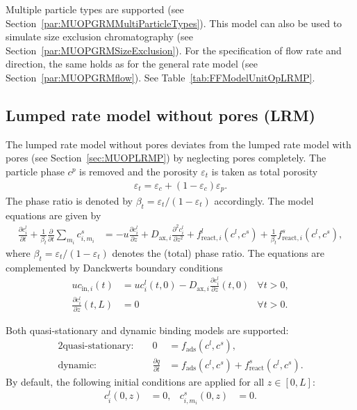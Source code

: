 Multiple particle types are supported (see Section~\ref{par:MUOPGRMMultiParticleTypes}).
This model can also be used to simulate size exclusion chromatography (see Section~\ref{par:MUOPGRMSizeExclusion}).
For the specification of flow rate and direction, the same holds as for the general rate model (see Section~\ref{par:MUOPGRMflow}).
See Table~\ref{tab:FFModelUnitOpLRMP}.

\subsection{Lumped rate model without pores (LRM)}\label{sec:MUOPLRM}

The lumped rate model without pores  \cite{Guiochon2006,Felinger2004} deviates from the lumped rate model with pores (see Section~\ref{sec:MUOPLRMP}) by neglecting pores completely.
The particle phase $c^p$ is removed and the porosity $\varepsilon_t$ is taken as total porosity
\begin{align}
	\varepsilon_t = \varepsilon_c + \left( 1 - \varepsilon_c \right) \varepsilon_p. \label{eq:TotalPorosity}
\end{align}
The phase ratio is denoted by $\beta_t = \varepsilon_t / (1 - \varepsilon_t)$ accordingly.
The model equations are given by
\begin{align}
	\frac{\partial c^l_i}{\partial t} + \frac{1}{\beta_t} \frac{\partial}{\partial t} \sum_{m_i} c^s_{i,m_i} &= -u \frac{\partial c^l_i}{\partial z} + D_{\text{ax},i} \frac{\partial^2 c^l_i}{\partial z^2} + f_{\text{react},i}^l\left( c^l, c^s \right) + \frac{1}{\beta_t} f_{\text{react},i}^s\left( c^l, c^s \right),
\end{align}
where $\beta_t = \varepsilon_t / (1 - \varepsilon_t)$ denotes the (total) phase ratio.
The equations are complemented by Danckwerts boundary conditions \cite{Danckwerts1953}
\begin{align*}
	u c_{\text{in},i}(t) &= u c^l_i(t,0) - D_{\text{ax},i} \frac{\partial c^l_i}{\partial z}(t, 0) & \forall t > 0,\\
	\frac{\partial c^l_i}{\partial z}(t, L) &= 0 & \forall t > 0.
\end{align*}

Both quasi-stationary and dynamic binding models are supported:
\begin{alignat*}{2}
	\text{quasi-stationary: }& & 0 &= f_{\text{ads}}\left( c^l, c^s\right), \\
	\text{dynamic: }& & \frac{\partial q}{\partial t} &= f_{\text{ads}}\left( c^l, c^s\right) + f_{\text{react}}^s\left( c^l, c^s \right).
\end{alignat*}
By default, the following initial conditions are applied for all $z \in [0,L]$:
\begin{align}
	c^l_i(0, z) &= 0, & c^s_{i,m_i}(0,z) &= 0.
\end{align}

